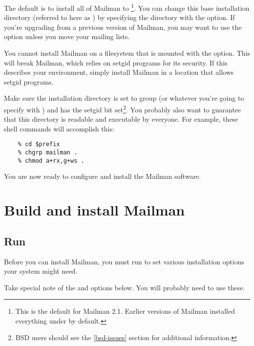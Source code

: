 \documentclass{howto}
\begin{document}
The default is to install all of Mailman to
\footnote{This is the default for Mailman 2.1.
Earlier versions of Mailman installed everything under  by
default.}.  You can change this base installation directory (referred to here
as ) by specifying the directory with the
  option.  If you're upgrading from
a previous version of Mailman, you may want to use the 
option unless you move your mailing lists.

\begin{notice}[warning]
You cannot install Mailman on a filesystem that is mounted with the
 option.  This will break Mailman, which relies on setgid
programs for its security.  If this describes your environment, simply install
Mailman in a location that allows setgid programs.
\end{notice}

Make sure the installation directory is set to group  (or
whatever you're going to specify with ) and has
the setgid bit set\footnote{BSD users should see the \ref{bsd-issues} section
for additional information.}.  You probably also want to guarantee that this
directory is readable and executable by everyone.  For example, these shell
commands will accomplish this:

\begin{verbatim}
    % cd $prefix
    % chgrp mailman .
    % chmod a+rx,g+ws .
\end{verbatim}

You are now ready to configure and install the Mailman software.

\section{Build and install Mailman\label{building}}

\subsection{Run }

Before you can install Mailman, you must run  to set
various installation options your system might need.

\begin{notice}[note]
Take special note of the  and
 options below.  You will probably need to use
these.
\end{notice}
\end{document}
